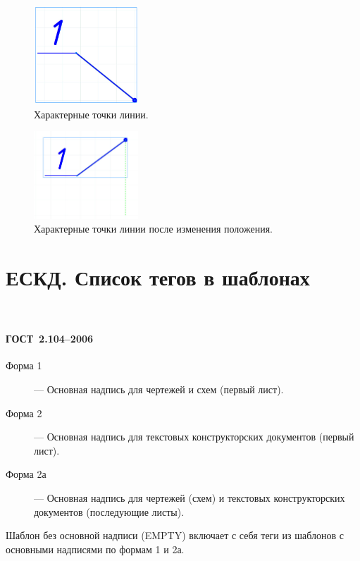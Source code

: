 \documentclass[14pt]{extreport}
\begin{document}
\noindent
{}\\

\begin{figure}[h]
	\centering
	\includegraphics[width=0.35\textwidth]{ESKD_Point_1}
    \caption{Характерные точки линии.\label{ESKD_Point_1}}
\end{figure}

\begin{figure}[h]
	\centering
	\includegraphics[width=0.35\textwidth]{ESKD_Point_2}
    \caption{Характерные точки линии после изменения положения.\label{ESKD_Point_2}}
\end{figure}


\appendix

\chapter{ЕСКД. Список тегов в шаблонах}
~\label{APP:ESKD}

\subsubsection{ГОСТ~2.104--2006}
\noindent
\begin{description}
	\item [Форма 1] --- Основная надпись для чертежей и схем (первый лист).
	\item [Форма 2] --- Основная надпись для текстовых конструкторских документов (первый лист).
	\item [Форма 2а] --- Основная надпись для чертежей (схем) и текстовых конструкторских документов (последующие листы).
\end{description}
Шаблон без основной надписи (\textsf{EMPTY}) включает с себя теги из шаблонов с основными надписями по формам 1 и 2а.
\end{document}
